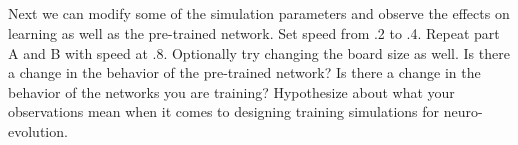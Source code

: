 \documentclass[12]{extarticle}
\begin{document}
\subsection{}
Next we can modify some of the simulation parameters and observe the effects on learning as well as the pre-trained network. Set speed from .2 to .4. Repeat part A and B with speed at .8. Optionally try changing the board size as well. Is there a change in the behavior of the pre-trained network? Is there a change in the behavior of the networks you are training? Hypothesize about what your observations mean when it comes to designing training simulations for neuro-evolution.

  


{}

\end{document}
